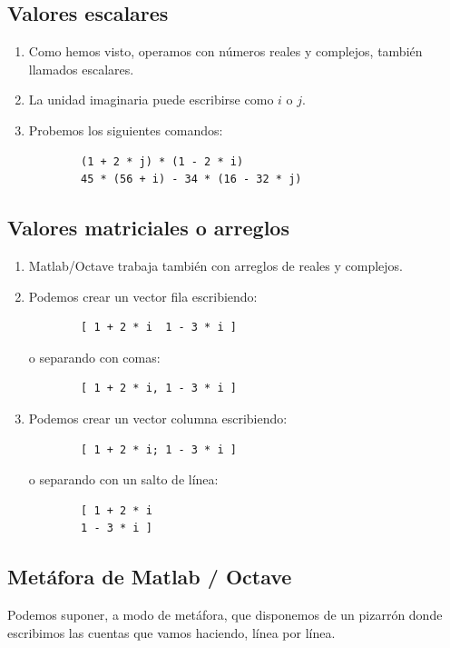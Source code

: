 \documentclass[11pt,a4paper,openany]{book}
\begin{document}
\subsection{Valores escalares}

\begin{enumerate}
	\item Como hemos visto, operamos con números reales y complejos, también llamados escalares.
	\item La unidad imaginaria puede escribirse como $i$ o $j$.
	\item Probemos los siguientes comandos:
	\begin{verbatim}
		(1 + 2 * j) * (1 - 2 * i)
		45 * (56 + i) - 34 * (16 - 32 * j)
	\end{verbatim}
\end{enumerate}

\subsection{Valores matriciales o arreglos}

\begin{enumerate}
	\item Matlab/Octave trabaja también con arreglos de reales y complejos.
	\item Podemos crear un vector fila escribiendo:
	\begin{verbatim}
		[ 1 + 2 * i  1 - 3 * i ]
	\end{verbatim}
	o separando con comas:
	\begin{verbatim}
		[ 1 + 2 * i, 1 - 3 * i ]
	\end{verbatim}
	
	\item Podemos crear un vector columna escribiendo:
	\begin{verbatim}
		[ 1 + 2 * i; 1 - 3 * i ]
	\end{verbatim}
	o separando con un salto de línea:
	\begin{verbatim}
		[ 1 + 2 * i
		1 - 3 * i ]
	\end{verbatim}
\end{enumerate}

\subsection{Metáfora de Matlab / Octave}

Podemos suponer, a modo de metáfora, que disponemos de un pizarrón donde escribimos las cuentas que vamos haciendo, línea por línea.
\end{document}
